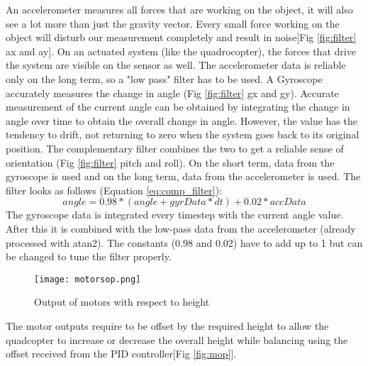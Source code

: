 An accelerometer measures all forces that are working on the object, it will also see a lot more than just the gravity vector. Every small force working on the object will disturb our measurement completely and result in noise[Fig \ref{fig:filter} ax and ay]. On an actuated system (like the quadrocopter), the forces that drive the system are visible on the sensor as well. The accelerometer data is reliable only on the long term, so a "low pass" filter has to be used.
\newline \newline
A Gyroscope accurately measures the change in angle (Fig \ref{fig:filter} gx and gy). Accurate measurement of the current angle can be obtained by integrating the change in angle over time to obtain the overall change in angle. However, the value has the tendency to drift, not returning to zero when the system goes back to its original position. 
\newline \newline
The complementary filter combines the two to get a reliable sense of orientation (Fig \ref{fig:filter} pitch and roll). On the short term, data from the gyroscope is used and on the long term, data from the accelerometer is used. The filter looks as follows (Equation \ref{eq:comp_filter}):
\begin{equation}
angle = 0.98*(angle+gyrData*dt)+0.02*accData
\label{eq:comp_filter} 
\end{equation}
\newline \newline
The gyroscope data is integrated every timestep with the current angle value. After this it is combined with the low-pass data from the accelerometer (already processed with atan2). The constants (0.98 and 0.02) have to add up to 1 but can be changed to tune the filter properly.

\begin{figure}[H]
  \centering
  \texttt{[image: motorsop.png]}
  \caption{Output of motors with respect to height\label{fig:mop}}
  \label{Motor output}  
\end{figure}
\noindent
The motor outputs require to be offset by the required height to allow the quadcopter to increase or decrease the overall height while balancing using the offset received from the PID controller[Fig \ref{fig:mop}].

